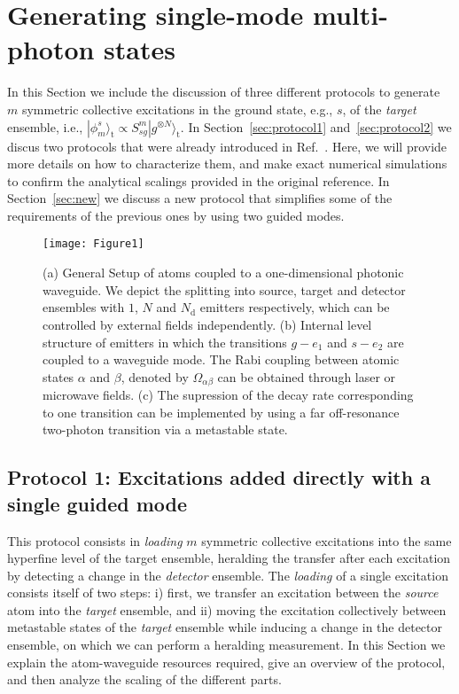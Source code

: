 \documentclass[twocolumn,pra,aps,superscriptaddress,showpacs]{revtex4-1}
\newcommand{\ket}[1]{|#1\rangle}
\newcommand{\rd}{\mathrm{d}}
\newcommand{\rt}{\mathrm{t}}
\begin{document}
\section{Generating single-mode multi-photon states\label{sec:single}}

In this Section we include the discussion of three different protocols to generate $m$ symmetric collective excitations in the ground state, e.g., $s$, of the \emph{target} ensemble, i.e., $\ket{\phi^s_m}_\rt \propto S_{sg}^m \ket{g^{\otimes N}}_\rt$. In Section~\ref{sec:protocol1} and~\ref{sec:protocol2} we discus two protocols that were already introduced in Ref.~\cite{gonzaleztudela17a}. Here, we will provide more details on how to characterize them, and make exact numerical simulations to confirm the analytical scalings provided in the original reference. In Section~\ref{sec:new} we discuss a new protocol that simplifies some of the requirements of the previous ones by using two guided modes.

\begin{figure}[t]
	\centering
	\texttt{[image: Figure1]}
	\caption{
		(a) General Setup of atoms coupled to a one-dimensional photonic waveguide. We depict the splitting into source, target and detector ensembles with $1$, $N$ and $N_\rd$ emitters respectively, which can be controlled by external fields independently.
		(b) Internal level structure of emitters in which the transitions $g - e_1$ and $s - e_2$ are coupled to a waveguide mode. 
		The Rabi coupling between atomic states $\alpha$ and $\beta$, denoted by $\Omega_{\alpha\beta}$ can be obtained through laser or microwave fields.
		(c) The supression of the decay rate corresponding to one transition can be implemented by using a far off-resonance two-photon transition via a metastable state.
	}
	\label{fig:Scheme}
\end{figure}

\subsection{Protocol 1: Excitations added directly with a single guided mode \label{sec:protocol1}}

This protocol consists in \emph{loading} $m$ symmetric collective excitations into the same hyperfine level of the target ensemble, heralding the transfer after each excitation by detecting a change in the \emph{detector} ensemble. The \emph{loading} of a single excitation consists itself of two steps:
i) first, we transfer an excitation between the \emph{source} atom into the \emph{target} ensemble, and
ii) moving the excitation collectively between metastable states of the \emph{target} ensemble while inducing a change in the detector ensemble, on which we can perform a heralding measurement.
In this Section we explain the atom-waveguide resources required, give an overview of the protocol, and then analyze the scaling of the different parts.
\end{document}
